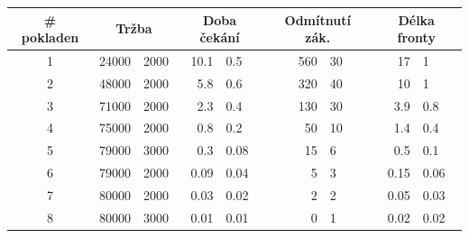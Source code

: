 \documentclass[a4paper,12pt]{article}
\begin{document}
\begin{tabular}{c|r@{$\pm$}l|r@{$\pm$}l|r@{$\pm$}l|r@{$\pm$}l}
	\# pokladen & \multicolumn{2}{|c|}{Tržba} & \multicolumn{2}{|c|}{Doba čekání} & \multicolumn{2}{|c|}{Odmítnutí zák.} & \multicolumn{2}{|c}{Délka fronty}\\ \hline\hline	
	1 &   24000 & 2000  &   10.1  &  0.5   &  560 & 30  &  17    & 1    \\
	2 &   48000 & 2000  &    5.8  &  0.6   &  320 & 40  &  10    & 1    \\
	3 &   71000 & 2000  &    2.3  &  0.4   &  130 & 30  &   3.9  & 0.8  \\
	4 &   75000 & 2000  &    0.8  &  0.2   &   50 & 10  &   1.4  & 0.4  \\
	5 &   79000 & 3000  &    0.3  &  0.08  &   15 &  6  &   0.5  & 0.1  \\
	6 &   79000 & 2000  &    0.09 &  0.04  &    5 &  3  &   0.15 & 0.06 \\
	7 &   80000 & 2000  &    0.03 &  0.02  &    2 &  2  &   0.05 & 0.03 \\
	8 &   80000 & 3000  &    0.01 &  0.01  &    0 &  1  &   0.02 & 0.02 
\end{tabular}
\end{document}
